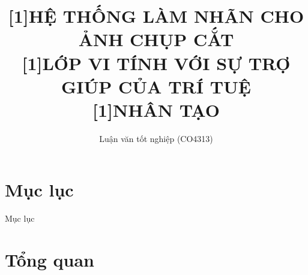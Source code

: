\documentclass[
	10pt,                %
	aspectratio=169,     %
]{beamer}
\title
	[Hệ thống làm nhãn cho ảnh chụp cắt lớp vi tính (CT) với sự trợ giúp của Trí tuệ nhân tạo]%
	{\scalebox{.84}[1]{HỆ THỐNG LÀM NHÃN CHO ẢNH CHỤP CẮT  }\\\scalebox{.84}[1]{LỚP VI TÍNH VỚI SỰ TRỢ GIÚP CỦA TRÍ TUỆ}\\\scalebox{.84}[1]{NHÂN TẠO}}
\subtitle
	{Luận văn tốt nghiệp (CO4313)}%
\institute
	[Khoa KH - KT Máy tính\\Đại học Bách Khoa]%
	{Khoa Khoa học - Kỹ thuật Máy tính\\Đại học Bách Khoa - Đại học quốc gia TP.HCM}
\begin{document}
\begin{frame}[noframenumbering]
	\titlepage
\end{frame}

\section*{Mục lục}
	\begin{frame}{Mục lục}
		\hfill
		\parbox[c]{.98\textwidth}{
			\vspace{-3mm}
			\tableofcontents[hideallsubsections]%
		}
	\end{frame}

\section{Tổng quan}
\end{document}
